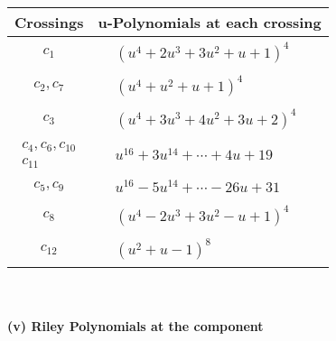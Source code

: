 \documentclass[1p]{elsarticle_modified}
\theoremstyle{definition}
\begin{document}
\begin{tabular}{m{50pt}|m{274pt}}
Crossings & \hspace{64pt}u-Polynomials at each crossing \\
\hline $$\begin{aligned}c_{1}\end{aligned}$$&$\begin{aligned}
&(u^4+2 u^3+3 u^2+u+1)^4
\end{aligned}$\\
\hline $$\begin{aligned}c_{2},c_{7}\end{aligned}$$&$\begin{aligned}
&(u^4+u^2+u+1)^4
\end{aligned}$\\
\hline $$\begin{aligned}c_{3}\end{aligned}$$&$\begin{aligned}
&(u^4+3 u^3+4 u^2+3 u+2)^4
\end{aligned}$\\
\hline $$\begin{aligned}c_{4},c_{6},c_{10}\\c_{11}\end{aligned}$$&$\begin{aligned}
&u^{16}+3 u^{14}+\cdots+4 u+19
\end{aligned}$\\
\hline $$\begin{aligned}c_{5},c_{9}\end{aligned}$$&$\begin{aligned}
&u^{16}-5 u^{14}+\cdots-26 u+31
\end{aligned}$\\
\hline $$\begin{aligned}c_{8}\end{aligned}$$&$\begin{aligned}
&(u^4-2 u^3+3 u^2- u+1)^4
\end{aligned}$\\
\hline $$\begin{aligned}c_{12}\end{aligned}$$&$\begin{aligned}
&(u^2+u-1)^8
\end{aligned}$\\
\hline
\end{tabular}\\~\\
\newpage\renewcommand{\arraystretch}{1}
\flushleft \textbf{(v) Riley Polynomials at the component}\newline \\
\end{document}
